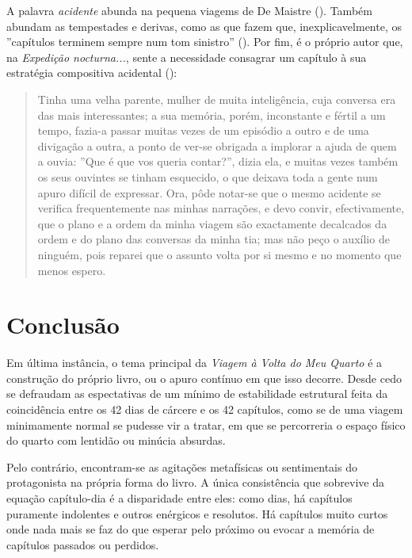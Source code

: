 \documentclass[12pt]{article}
\newenvironment{citacao}
{\begin{quote}
    \begin{small}
      \itshape
      \linespread{1}
}
{\end{small}\end{quote}}
\begin{document}
A palavra \emph{acidente} abunda na pequena viagems de De Maistre
(\cite[p.71, p.115, p.139, p.182, p.191, p.195,
  p. 205]{demaistre}). Também abundam as tempestades e derivas, como
as que fazem que, inexplicavelmente, os ''capítulos terminem sempre
num tom sinistro'' (\cite[p.61]{demaistre}). Por fim, é o próprio
autor que, na \emph{Expedição nocturna...}, sente a necessidade
consagrar um capítulo à sua estratégia compositiva acidental
(\cite[p.182]{demaistre}):

\singlespacing

\begin{citacao}
  Tinha uma velha parente, mulher de muita inteligência, cuja conversa
  era das mais interessantes; a sua memória, porém, inconstante e
  fértil a um tempo, fazia-a passar muitas vezes de um episódio a
  outro e de uma divigação a outra, a ponto de ver-se obrigada a
  implorar a ajuda de quem a ouvia: ''Que é que vos queria contar?'',
  dizia ela, e muitas vezes também os seus ouvintes se tinham
  esquecido, o que deixava toda a gente num apuro difícil de
  expressar. Ora, pôde notar-se que o mesmo acidente se verifica
  frequentemente nas minhas narrações, e devo convir, efectivamente,
  que o plano e a ordem da minha viagem são exactamente decalcados da
  ordem e do plano das conversas da minha tia; mas não peço o auxílio
  de ninguém, pois reparei que o assunto volta por si mesmo e no
  momento que menos espero.
\end{citacao}

\doublespacing

\section{Conclusão}

Em última instância, o tema principal da \emph{Viagem à Volta do Meu
  Quarto} é a construção do próprio livro, ou o apuro contínuo em que
isso decorre. Desde cedo se defraudam as espectativas de um mínimo de
estabilidade estrutural feita da coincidência entre os 42 dias de
cárcere e os 42 capítulos, como se de uma viagem minimamente normal se
pudesse vir a tratar, em que se percorreria o espaço físico do quarto
com lentidão ou minúcia absurdas.

Pelo contrário, encontram-se as agitações metafísicas ou sentimentais
do protagonista na própria forma do livro. A única consistência que
sobrevive da equação capítulo-dia é a disparidade entre eles: como
dias, há capítulos puramente indolentes e outros enérgicos e
resolutos. Há capítulos muito curtos onde nada mais se faz do que
esperar pelo próximo ou evocar a memória de capítulos passados ou
perdidos.
\end{document}

